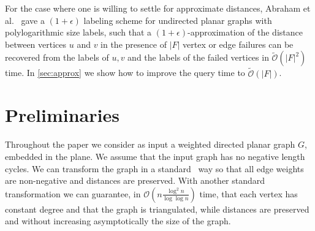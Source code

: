 \documentclass[11pt]{article}
\theoremstyle{plain}
\newcommand{\cO}{\mathcal{O}}
\newcommand{\cOtilde}{\tilde{\cO}}
\begin{document}
For the case where one is willing to settle for approximate distances, Abraham et al.~\cite{DBLP:conf/stoc/AbrahamCG12} gave a $(1+\epsilon)$ labeling scheme for undirected planar graphs with polylogarithmic size labels, such that a $(1+\epsilon)$-approximation of the distance between vertices $u$ and $v$ in the presence of $|F|$ vertex or edge failures can be recovered from the labels of $u,v$ and the labels of the failed vertices in $\cOtilde(|F|^2)$ time. 
In \cref{sec:approx} we show how to improve the query time to $\cOtilde(|F|)$.



\section{Preliminaries} \label{sec:prelim}

Throughout the paper we consider as input a weighted directed planar graph $G$, embedded in the plane.
We assume that the input graph has no negative length cycles.
We can transform the graph in a standard~\cite{DBLP:conf/esa/MozesW10} way so that all edge weights are non-negative and distances are preserved.
With another standard transformation we can guarantee, in $\cO(n \frac{\log^2 n}{\log \log n})$ time, that each vertex has constant degree and that the graph is triangulated, while distances are preserved and without increasing asymptotically the size of the graph.
\end{document}
